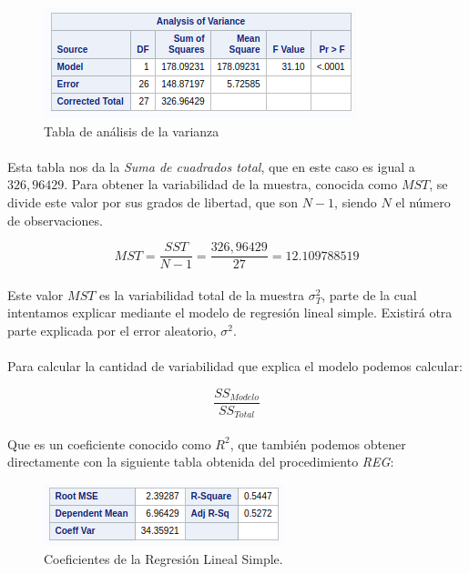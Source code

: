 \documentclass{article}
\begin{document}
  \begin{figure}[H]
    \centering
    \includegraphics[width=.5\linewidth]{img/montgomery/anovatable.png}
    \caption{Tabla de análisis de la varianza}
    \label{img:mont-anova}
  \end{figure}

  \paragraph{}
  Esta tabla nos da la \textit{Suma de cuadrados total}, que en este caso es igual a $326,96429$. Para obtener la variabilidad de la muestra, conocida como $MST$, se divide este valor por sus grados de libertad, que son $N-1$, siendo $N$ el número de observaciones.

  \begin{equation}
    MST = \frac{SST}{N-1} = \frac{326,96429}{27} = 12.109788519
  \end{equation}

  \paragraph{}
  Este valor $MST$ es la variabilidad total de la muestra $\sigma_T^2$, parte de la cual intentamos explicar mediante el modelo de regresión lineal simple. Existirá otra parte explicada por el error aleatorio, $\sigma^2$.

  \paragraph{}
  Para calcular la cantidad de variabilidad que explica el modelo podemos calcular:

  \begin{equation}
    \frac{SS_{Modelo}}{SS_{Total}}
  \end{equation}

  \paragraph{}
  Que es un coeficiente conocido como $R^2$, que también podemos obtener directamente con la siguiente tabla obtenida del procedimiento \textit{REG}:

  \begin{figure}[H]
    \centering
    \includegraphics[width=.35\linewidth]{img/montgomery/tablaregaux.png}
    \caption{Coeficientes de la Regresión Lineal Simple.}
    \label{img:mont-tabla-aux}
  \end{figure}
\end{document}
